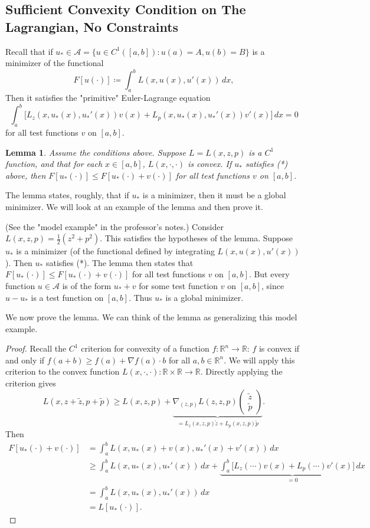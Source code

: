 \documentclass[11pt]{book}
\newcommand{\R}{\mathbb{R}}
\newtheorem{lemma}{Lemma}[subsection]
\begin{document}
\subsection{Sufficient Convexity Condition on The Lagrangian, No Constraints}

Recall that if $u_* \in \mathcal{A} = \{ u \in C^1([a, b]) : u(a) = A, u(b) = B \}$ is a minimizer of the functional
\[
F[u(\cdot)] \coloneqq \int_a^b L(x, u(x), u'(x)) \, dx,
\]
Then it satisfies the "primitive" Euler-Lagrange equation
\[
\tag{*}
\int_a^b \Bigg[ L_z(x, u_*(x), u_*'(x))v(x) +  L_p(x, u_*(x), u_*'(x))v'(x) \Bigg] \, dx = 0
\]
for all test functions $v$ on $[a, b]$.

\begin{lemma}
Assume the conditions above. Suppose $L = L(x,z,p)$ is a $C^1$ function, and that for each $x \in [a, b]$, $L(x, \cdot, \cdot)$ is convex. If $u_*$ satisfies (*) above, then $F[u_*(\cdot)] \leq F[u_*(\cdot) + v(\cdot)]$ for all test functions $v$ on $[a, b]$.
\end{lemma}

The lemma states, roughly, that if $u_*$ is a minimizer, then it must be a global minimizer. We will look at an example of the lemma and then prove it.

(See the "model example" in the professor's notes.) Consider $L(x,z,p) = \frac{1}{2}(z^2 + p^2)$. This satisfies the hypotheses of the lemma. Suppose $u_*$ is a minimizer (of the functional defined by integrating $L(x, u(x), u'(x))$). Then $u_*$ satisfies (*). The lemma then states that $F[u_*(\cdot)] \leq F[u_*(\cdot) + v(\cdot)]$ for all test functions $v$ on $[a, b]$.  But every function $u \in \mathcal{A}$ is of the form $u_* + v$ for some test function $v$ on $[a, b]$, since $u - u_*$ is a test function on $[a, b]$. Thus $u_*$ is a global minimizer.

We now prove the lemma. We can think of the lemma as generalizing this model example.

\begin{proof}
Recall the $C^1$ criterion for convexity of a function $f : \R^n \to \R$: $f$ is convex if and only if $f(a + b) \geq f(a) + \nabla f(a) \cdot b$ for all $a,b \in \R^n$. We will apply this criterion to the convex function $L(x, \cdot, \cdot) : \R \times \R \to \R$. Directly applying the criterion gives
\[
L(x, z + \tilde{z}, p + \tilde{p}) \geq L(x,z,p) + \underbrace{\nabla_{(z,p)}L(z,z,p) \begin{pmatrix}
\tilde{z} \\ \tilde{p}
\end{pmatrix}}_{=L_z(x,z,p)\tilde{z} + L_p(x,z,p)\tilde{p}}.
\]
Then
\begin{align*}
F[u_*(\cdot) + v(\cdot)] &= \int_a^b L(x, u_*(x) + v(x), u_*'(x) + v'(x)) \, dx \\
&\geq \int_a^b L(x, u_*(x), u_*'(x)) \, dx +  \underbrace{\int_a^b \Bigg[ L_z(\cdots)v(x) + L_p(\cdots)v'(x) \Bigg] \, dx}_{=0} \\
&= \int_a^b L(x, u_*(x), u_*'(x)) \, dx \\
&= L[u_*(\cdot)].
\end{align*}
\end{proof}
\end{document}
